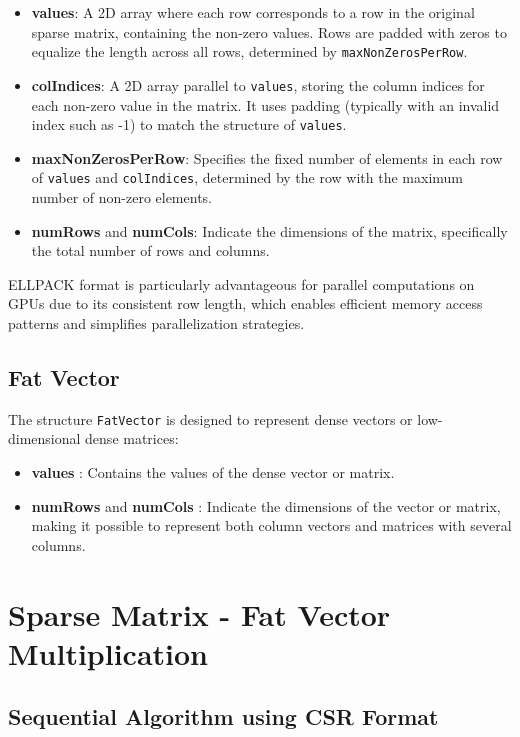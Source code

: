 \documentclass[12pt,oneside]{book} %
\begin{document}
\begin{itemize}
    \item \textbf{values}: A 2D array where each row corresponds to a row in the original sparse matrix, containing the non-zero values. Rows are padded with zeros to equalize the length across all rows, determined by \texttt{maxNonZerosPerRow}.
    \item \textbf{colIndices}: A 2D array parallel to \texttt{values}, storing the column indices for each non-zero value in the matrix. It uses padding (typically with an invalid index such as -1) to match the structure of \texttt{values}.
    \item \textbf{maxNonZerosPerRow}: Specifies the fixed number of elements in each row of \texttt{values} and \texttt{colIndices}, determined by the row with the maximum number of non-zero elements.
    \item \textbf{numRows} and \textbf{numCols}: Indicate the dimensions of the matrix, specifically the total number of rows and columns.
\end{itemize}

ELLPACK format is particularly advantageous for parallel computations on GPUs
due to its consistent row length, which enables efficient memory access
patterns and simplifies parallelization strategies.

\subsection{Fat Vector}
The structure \texttt{FatVector} is designed to represent dense vectors or
low-dimensional dense matrices:

\begin{itemize}
    \item \textbf{values} : Contains the values of the dense vector or matrix.
    \item \textbf{numRows} and \textbf{numCols} : Indicate the dimensions of the vector or matrix, making it possible to represent both column vectors and matrices with several columns.
\end{itemize}

\newpage
\section{Sparse Matrix - Fat Vector Multiplication}

\subsection{Sequential Algorithm using CSR Format}
\end{document}
